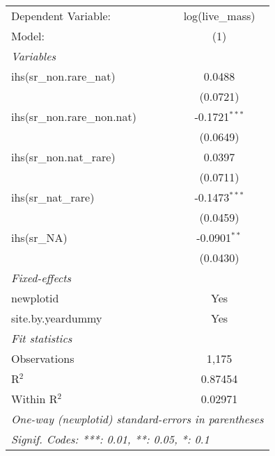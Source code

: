 \begin{tabular}{lc}
\tabularnewline\midrule\midrule
Dependent Variable:&log(live\_mass)\\
Model:&(1)\\
\midrule \emph{Variables}&  \\
ihs(sr\_non.rare\_nat)&0.0488\\
  &(0.0721)\\
ihs(sr\_non.rare\_non.nat)&-0.1721$^{***}$\\
  &(0.0649)\\
ihs(sr\_non.nat\_rare)&0.0397\\
  &(0.0711)\\
ihs(sr\_nat\_rare)&-0.1473$^{***}$\\
  &(0.0459)\\
ihs(sr\_NA)&-0.0901$^{**}$\\
  &(0.0430)\\
\midrule \emph{Fixed-effects}&  \\
newplotid & Yes\\
site.by.yeardummy & Yes\\
\midrule \emph{Fit statistics}&  \\
Observations & 1,175\\
R$^2$ & 0.87454\\
Within R$^2$ & 0.02971\\
\midrule\midrule\multicolumn{2}{l}{\emph{One-way (newplotid) standard-errors in parentheses}}\\
\multicolumn{2}{l}{\emph{Signif. Codes: ***: 0.01, **: 0.05, *: 0.1}}\\
\end{tabular}


